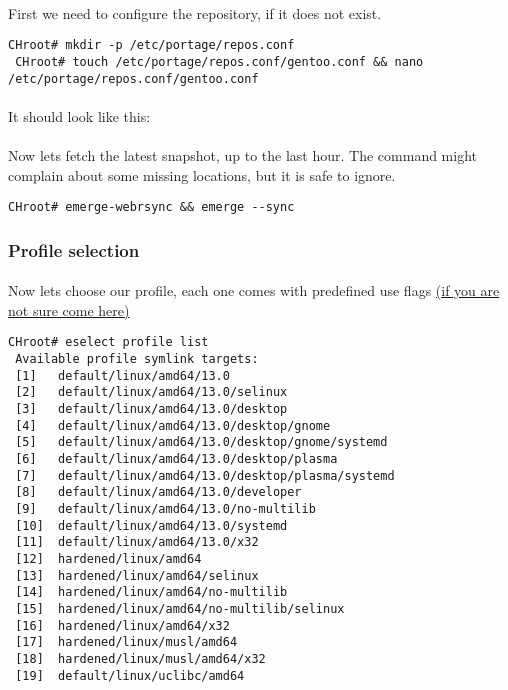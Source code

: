 \documentclass[11pt,a4paper]{article}
\begin{document}
                \paragraph{} First we need to configure the repository, if it does not exist.

                \begin{lstlisting}[style=BashInputCHRoot]
 CHroot# mkdir -p /etc/portage/repos.conf
 CHroot# touch /etc/portage/repos.conf/gentoo.conf && nano /etc/portage/repos.conf/gentoo.conf
                \end{lstlisting}

                \paragraph{} It should look like this:

                

                \paragraph{} Now lets fetch the latest snapshot, up to the last hour. The command might complain about some missing locations, but it is safe to ignore.

                \begin{lstlisting}[style=BashInputCHRoot]
 CHroot# emerge-webrsync && emerge --sync
                \end{lstlisting}

           \newpage
            \subsubsection{Profile selection}

                \paragraph{} Now lets choose our profile, each one comes with predefined use flags \href{https://wiki.gentoo.org/wiki/Handbook:PPC/Working/USE}{(if you are not sure come here)}

                \begin{lstlisting}[style=BashInputCHRoot]
 CHroot# eselect profile list
 Available profile symlink targets:
 [1]   default/linux/amd64/13.0
 [2]   default/linux/amd64/13.0/selinux
 [3]   default/linux/amd64/13.0/desktop
 [4]   default/linux/amd64/13.0/desktop/gnome
 [5]   default/linux/amd64/13.0/desktop/gnome/systemd
 [6]   default/linux/amd64/13.0/desktop/plasma
 [7]   default/linux/amd64/13.0/desktop/plasma/systemd
 [8]   default/linux/amd64/13.0/developer
 [9]   default/linux/amd64/13.0/no-multilib
 [10]  default/linux/amd64/13.0/systemd
 [11]  default/linux/amd64/13.0/x32
 [12]  hardened/linux/amd64
 [13]  hardened/linux/amd64/selinux
 [14]  hardened/linux/amd64/no-multilib
 [15]  hardened/linux/amd64/no-multilib/selinux
 [16]  hardened/linux/amd64/x32
 [17]  hardened/linux/musl/amd64
 [18]  hardened/linux/musl/amd64/x32
 [19]  default/linux/uclibc/amd64
                \end{lstlisting}
\end{document}
